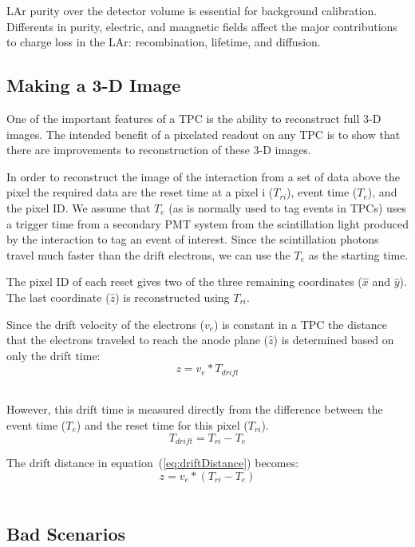 LAr purity over the detector volume is essential for background calibration.
Differents in purity, electric, and maagnetic fields affect the major contributions to charge loss in the LAr: recombination, lifetime, and diffusion.

\subsection{Making a 3-D Image}

One of the important features of a TPC is the ability to reconstruct full 3-D images.
The intended benefit of a pixelated readout on any TPC is to show that there are improvements to reconstruction of these 3-D images.

In order to reconstruct the image of the interaction from a set of data above the pixel the required data are the reset time at a pixel i ($T_{ri}$), event time ($T_{e}$), and the pixel ID.
We assume that $T_{e}$ (as is normally used to tag events in TPCs) uses a trigger time from a secondary PMT system from the scintillation light produced by the interaction to tag an event of interest.
Since the scintillation photons travel much faster than the drift electrons, we can use the $T_{e}$ as the starting time.

The pixel ID of each reset gives two of the three remaining coordinates ($\hat{x}$ and $\hat{y}$).
The last coordinate ($\hat{z}$) is reconstructed using $T_{ri}$.

Since the drift velocity of the electrons ($v_{e}$) is constant in a TPC the distance that the electrons traveled to reach the anode plane ($\hat{z}$) is determined based on only the drift time:
\begin{equation}
  z = v_{e} * T_{drift}
\end{equation}~\label{eq:driftDistance}

However, this drift time is measured directly from the difference between the event time ($T_{e}$) and the reset time for this pixel ($T_{ri}$).
\begin{equation}
  T_{drift} = T_{ri} - T_{e}
\end{equation}

The drift distance in equation~(\ref{eq:driftDistance}) becomes:
\begin{equation}
  z = v_{e} * (T_{ri} - T_{e})
\end{equation}~\label{eq:driftDistanceCalc}

\subsection{Bad Scenarios}

